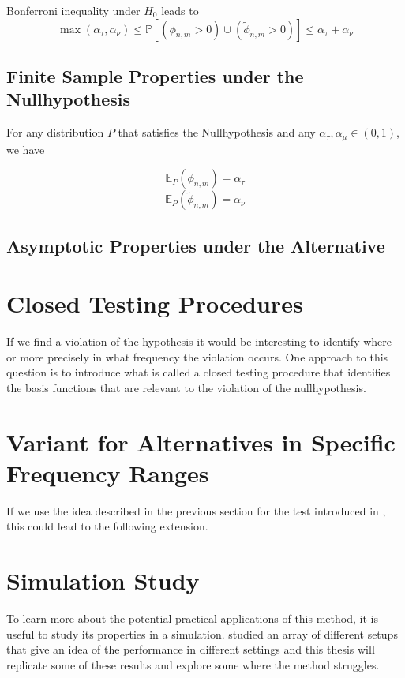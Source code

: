 \documentclass[12pt, a4paper]{article}
\theoremstyle{MAstyle} \newtheorem{assumption}{Assumption}[section]
\theoremstyle{MAstyle} \newtheorem{definition}{Definition}[section]
\begin{document}
			Bonferroni inequality under $H_0$ leads to
			\begin{equation}
				\max(\alpha_{\tau}, \alpha_{\nu}) \leq \mathbb{P}\left[(\phi_{n,m} > 0) \cup (\tilde{\phi}_{n,m} > 0)\right] \leq \alpha_{\tau} + \alpha_{\nu}
			\end{equation}
		
		\subsection{Finite Sample Properties under the Nullhypothesis}
		For any distribution $P$ that satisfies the Nullhypothesis and any $\alpha_{\tau}, \alpha_{\mu} \in (0,1)$, we have 
		\begin{multicols}{2}
			\noindent
			\begin{equation*}
				\mathbb{E}_P\left(\phi_{n,m}\right) = \alpha_{\tau}
			\end{equation*}			
			\begin{equation}
				\mathbb{E}_P\left(\tilde{\phi}_{n,m}\right) = \alpha_{\nu}
			\end{equation}
		\end{multicols}
		
		\subsection{Asymptotic Properties under the Alternative}
		
	\section{Closed Testing Procedures}\label{closed_testing}
		If we find a violation of the hypothesis it would be interesting to identify where or more precisely in what frequency the violation occurs. One approach to this question is to introduce what is called a closed testing procedure that identifies the basis functions that are relevant to the violation of the nullhypothesis. 			
		
	\section{Variant for Alternatives in Specific Frequency Ranges}\label{frequency_identification}
		If we use the idea described in the previous section for the test introduced in \cite{bugni_permutation_2021}, this could lead to the following extension.
		
	\section{Simulation Study}\label{Simulation_Study}
		To learn more about the potential practical applications of this method, it is useful to study its properties in a simulation. \cite{bugni_permutation_2021} studied an array of different setups that give an idea of the performance in different settings and this thesis will replicate some of these results and explore some where the method struggles.
	
\end{document}
